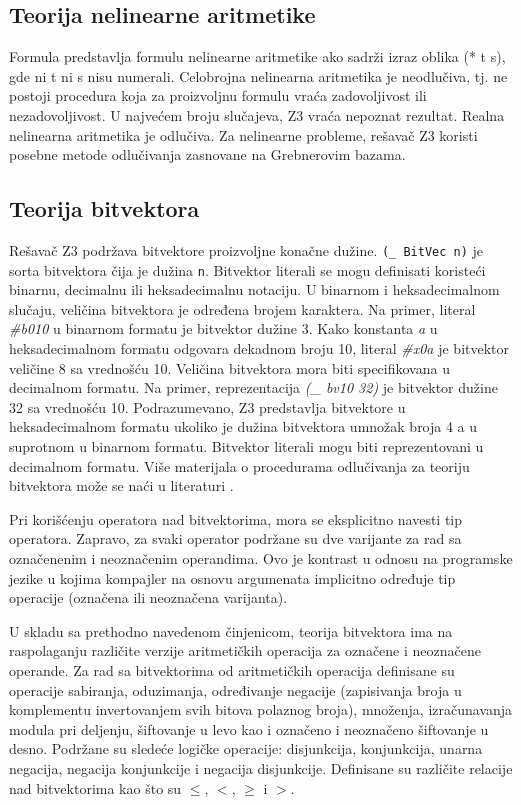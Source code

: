 \documentclass[12pt,oneside]{memoir}
\begin{document}
\subsection{Teorija nelinearne aritmetike} 

Formula predstavlja formulu nelinearne aritmetike ako sadrži izraz oblika (* t s), gde ni t ni s nisu numerali.
Celobrojna nelinearna aritmetika je neodlučiva, tj. ne postoji procedura koja za proizvoljnu formulu vraća zadovoljivost ili nezadovoljivost. U najvećem broju slučajeva, Z3 vraća nepoznat rezultat. Realna nelinearna aritmetika je odlučiva. Za nelinearne probleme, rešavač Z3 koristi posebne metode odlučivanja zasnovane na Grebnerovim bazama. 


\subsection{Teorija bitvektora} 
Rešavač Z3 podržava bitvektore proizvoljne konačne dužine. \texttt{(\_ BitVec n)} je sorta bitvektora čija je dužina \texttt{n}. Bitvektor literali se mogu definisati koristeći binarnu, decimalnu ili heksadecimalnu notaciju. U binarnom i heksadecimalnom slučaju, veličina bitvektora je određena brojem karaktera. Na primer, literal \textit{\#b010} u binarnom formatu je bitvektor dužine 3. Kako konstanta \textit{a} u heksadecimalnom formatu odgovara dekadnom broju 10, literal \textit{\#x0a} je bitvektor veličine 8 sa vrednošću 10. Veličina bitvektora mora biti specifikovana u decimalnom formatu. Na primer, reprezentacija \textit{(\_ bv10 32)} je bitvektor dužine 32 sa vrednošću 10. Podrazumevano, Z3 predstavlja bitvektore u heksadecimalnom formatu ukoliko je dužina bitvektora umnožak broja 4 a u suprotnom u binarnom formatu. Bitvektor literali mogu biti reprezentovani u decimalnom formatu. Više materijala o procedurama odlučivanja za teoriju bitvektora može se naći u literaturi \cite{DPBitvector}.

Pri korišćenju operatora nad bitvektorima, mora se eksplicitno navesti tip operatora. Zapravo, za svaki operator podržane su dve varijante za rad sa označenenim i neoznačenim operandima. Ovo je kontrast u odnosu na programske jezike u kojima kompajler na osnovu argumenata implicitno određuje tip operacije (označena ili neoznačena varijanta).
\par
U skladu sa prethodno navedenom činjenicom, teorija bitvektora ima na raspolaganju različite verzije aritmetičkih operacija za označene i neoznačene operande. Za rad sa bitvektorima od aritmetičkih operacija definisane su operacije sabiranja, oduzimanja, određivanje negacije (zapisivanja broja u komplementu invertovanjem svih bitova polaznog broja), množenja, izračunavanja modula pri deljenju, šiftovanje u levo kao i označeno i neoznačeno šiftovanje u desno. Podržane su sledeće logičke operacije: disjunkcija, konjunkcija, unarna negacija, negacija konjunkcije i negacija disjunkcije. Definisane su različite relacije nad bitvektorima kao što su $\leq$, $<$, $\geq$ i $>$.
\end{document}
